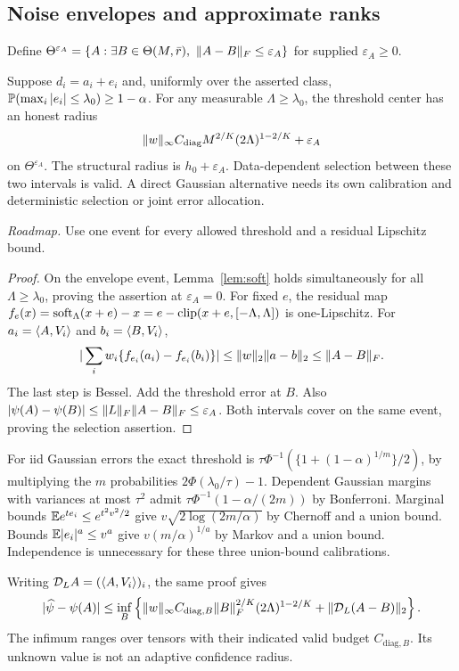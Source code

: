\subsection{Noise envelopes and approximate ranks}
Define $\Theta^{\varepsilon_A}=\{A:\exists B\in\Theta(M,\bar r),\ \lVert A-B\rVert_F\le\varepsilon_A\}$ for supplied $\varepsilon_A\ge0$.
\begin{proposition}\label{prop:envelope}
Suppose $d_i=a_i+e_i$ and, uniformly over the asserted class,
$\mathbb P(\max_i|e_i|\le\lambda_0)\ge1-\alpha$.
For any measurable $\Lambda\ge\lambda_0$, the threshold center has an honest radius
\[
 \lVert w\rVert_\infty C_{\mathrm{diag}} M^{2/K}(2\Lambda)^{1-2/K}+\varepsilon_A
\]
on $\Theta^{\varepsilon_A}$. The structural radius is $h_0+\varepsilon_A$.
Data-dependent selection between these two intervals is valid.
A direct Gaussian alternative needs its own calibration and deterministic selection or joint error allocation.
\end{proposition}
\noindent\emph{Roadmap.} Use one event for every allowed threshold and a residual Lipschitz bound.
\begin{proof}
On the envelope event, Lemma~\ref{lem:soft} holds simultaneously for all $\Lambda\ge\lambda_0$, proving the assertion at $\varepsilon_A=0$.
For fixed $e$, the residual map
$f_e(x)=\operatorname{soft}_\Lambda(x+e)-x=e-\operatorname{clip}(x+e,[-\Lambda,\Lambda])$
is one-Lipschitz. For $a_i=\langle A,V_i\rangle$ and $b_i=\langle B,V_i\rangle$,
\[
 |\sum_iw_i\{f_{e_i}(a_i)-f_{e_i}(b_i)\}|
 \le\lVert w\rVert_2\lVert a-b\rVert_2\le\lVert A-B\rVert_F.
\]
The last step is Bessel. Add the threshold error at $B$.
Also $|\psi(A)-\psi(B)|\le\lVert L\rVert_F\lVert A-B\rVert_F\le\varepsilon_A$.
Both intervals cover on the same event, proving the selection assertion.
\end{proof}
For iid Gaussian errors the exact threshold is
$\tau\Phi^{-1}(\{1+(1-\alpha)^{1/m}\}/2)$,
by multiplying the $m$ probabilities $2\Phi(\lambda_0/\tau)-1$.
Dependent Gaussian margins with variances at most $\tau^2$ admit
$\tau\Phi^{-1}(1-\alpha/(2m))$ by Bonferroni.
Marginal bounds $\mathbb E e^{te_i}\le e^{t^2v^2/2}$ give
$v\sqrt{2\log(2m/\alpha)}$ by Chernoff and a union bound.
Bounds $\mathbb E|e_i|^a\le v^a$ give $v(m/\alpha)^{1/a}$ by Markov and a union bound.
Independence is unnecessary for these three union-bound calibrations.

Writing $\mathcal D_L A=(\langle A,V_i\rangle)_i$, the same proof gives
\[
 |\widehat\psi-\psi(A)|\le\inf_B\left\{
 \lVert w\rVert_\infty C_{\mathrm{diag},B}\lVert B\rVert_F^{2/K}(2\Lambda)^{1-2/K}
 +\lVert \mathcal D_L(A-B)\rVert_2\right\}.
\]
The infimum ranges over tensors with their indicated valid budget $C_{\mathrm{diag},B}$.
Its unknown value is not an adaptive confidence radius.

